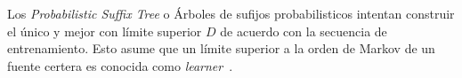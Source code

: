 


Los \emph{Probabilistic Suffix Tree} o Árboles de sufijos probabilisticos intentan construir el único y mejor \VMM con límite superior $D$ de acuerdo con la secuencia de entrenamiento. Esto asume que un límite superior a la orden de Markov de un fuente certera es conocida como \emph{learner}~\cite{PenaSordo2015}.
 
 





